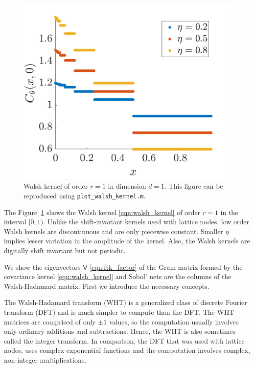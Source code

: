 \documentclass{iitthesis}          %
\newcommand{\mV}{\mathsf{V}}
\newcommand{\code}[1]{\texttt{#1}}
\newcommand\figref{Figure~\ref}
\newcommand{\JRNote}[1]{}
\begin{document}
\begin{figure}
	\centering
	\includegraphics[width=0.9\linewidth]{"figures/walsh_kernel dim_1"}
	\caption[Walsh kernel]{Walsh kernel of order $r=1$ in dimension $d=1$. This figure can be reproduced using \code{plot\_walsh\_kernel.m}. %
	}
	\label{fig:walshkernel-dim1}
\end{figure}

The \figref{fig:walshkernel-dim1} shows the Walsh kernel \eqref{eqn:walsh_kernel} of order $r=1$ in the interval $[0,1)$. Unlike the shift-invariant kernels used with lattice nodes, low order Walsh kernels are discontinuous and are only piecewise constant. Smaller $\eta$ implies lesser variation in the amplitude of the kernel. Also, the Walsh kernels are digitally shift invariant but not periodic.


We show the eigenvectors $\mV$ \eqref{eqn:ftk_factor} of the Gram matrix formed by the covariance kernel \eqref{eqn:walsh_kernel} and Sobol' nets are the columns of the Walsh-Hadamard matrix. First we introduce the necessary concepts.

The Walsh-Hadamard transform (WHT) is a generalized class of discrete Fourier transform (DFT) and is much simpler to compute than the DFT. The WHT matrices are comprised of only $\pm 1$ values, so the computation usually involves only ordinary additions and subtractions. Hence, the WHT is also sometimes called the integer transform. In comparison, the DFT that was used with lattice nodes,  uses complex exponential functions and the computation involves complex, non-integer multiplications. 
\end{document}
